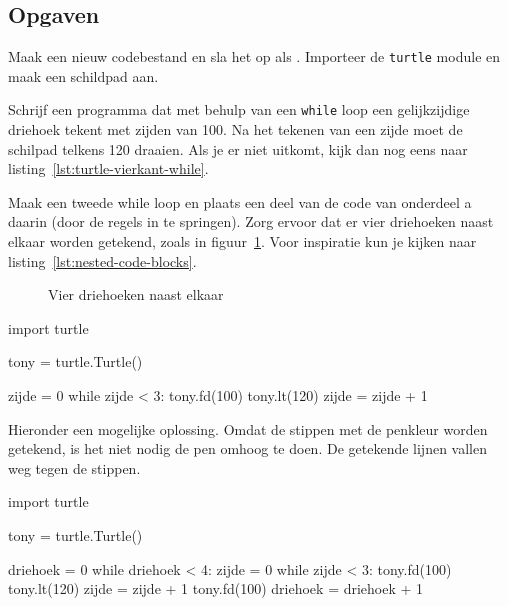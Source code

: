 \documentclass[../main]{subfiles}
\begin{document}
\subsection*{Opgaven}

\begin{opgave}[icons={laptop}]
Maak een nieuw codebestand en sla het op als . Importeer de \texttt{turtle} module en maak een schildpad aan. 
\begin{qlist}
\item Schrijf een programma dat met behulp van een \texttt{while} loop een gelijkzijdige driehoek tekent met zijden van 100. Na het tekenen van een zijde moet de schilpad telkens 120\textdegree{} draaien. Als je er niet uitkomt, kijk dan nog eens naar listing~\ref{lst:turtle-vierkant-while}.
\item Maak een tweede while loop en plaats een deel van de code van onderdeel \textsf{a} daarin (door de regels in te springen). Zorg ervoor dat er vier driehoeken naast elkaar worden getekend, zoals in figuur~\ref{fig:turtle-triangles}. Voor inspiratie kun je kijken naar listing~\ref{lst:nested-code-blocks}.

\begin{figure}[ht]
    \centering
    \caption{Vier driehoeken naast elkaar}%
    \label{fig:turtle-triangles}
\end{figure}
\end{qlist}
\end{opgave}
\begin{antwoord}
\begin{qlist}
\item%
\begin{python-breakable}[style=mu-noframe]
import turtle

tony = turtle.Turtle()

zijde = 0
while zijde < 3:
    tony.fd(100)
    tony.lt(120)
    zijde = zijde + 1
\end{python-breakable}
\item Hieronder een mogelijke oplossing. Omdat de stippen met de penkleur worden getekend, is het niet nodig de pen omhoog te doen. De getekende lijnen vallen weg tegen de stippen.
\begin{python-breakable}[style=mu]
import turtle

tony = turtle.Turtle()

driehoek = 0
while driehoek < 4:
    zijde = 0
    while zijde < 3:
        tony.fd(100)
        tony.lt(120)
        zijde = zijde + 1
    tony.fd(100)
    driehoek = driehoek + 1
\end{python-breakable}
\end{qlist}

\end{antwoord}
\end{document}
